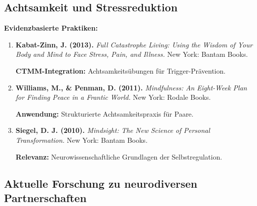 \subsection{Achtsamkeit und Stressreduktion}

\begin{ctmmGreenBox}[title=Mindfulness-Based Interventions]

\textbf{Evidenzbasierte Praktiken:}
\begin{enumerate}
    \item \textbf{Kabat-Zinn, J. (2013).} \textit{Full Catastrophe Living: Using the Wisdom of Your Body and Mind to Face Stress, Pain, and Illness.} New York: Bantam Books.
    
    \textbf{CTMM-Integration:} Achtsamkeitsübungen für Trigger-Prävention.
    
    \item \textbf{Williams, M., \& Penman, D. (2011).} \textit{Mindfulness: An Eight-Week Plan for Finding Peace in a Frantic World.} New York: Rodale Books.
    
    \textbf{Anwendung:} Strukturierte Achtsamkeitspraxis für Paare.
    
    \item \textbf{Siegel, D. J. (2010).} \textit{Mindsight: The New Science of Personal Transformation.} New York: Bantam Books.
    
    \textbf{Relevanz:} Neurowissenschaftliche Grundlagen der Selbstregulation.
\end{enumerate}

\end{ctmmGreenBox}

\subsection{Aktuelle Forschung zu neurodiversen Partnerschaften}

